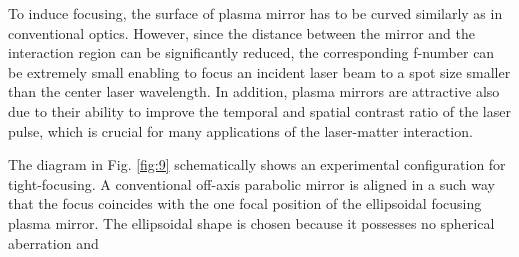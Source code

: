 To induce focusing, the surface of plasma mirror has to be curved similarly as in conventional optics. However, since the distance between the mirror and the interaction region can be significantly reduced, the corresponding f-number can be extremely small enabling to focus an incident laser beam to a spot size smaller than the center laser wavelength. In addition, plasma mirrors are attractive also due to their ability to improve the temporal and spatial contrast ratio of the laser pulse, which is crucial for many applications of the laser-matter interaction.

The diagram in Fig. \ref{fig:9} schematically shows an experimental configuration for tight-focusing. A conventional off-axis parabolic mirror is aligned in a such way that the focus coincides with the one focal position of the ellipsoidal focusing plasma mirror. The ellipsoidal shape is chosen because it possesses no spherical aberration and 








